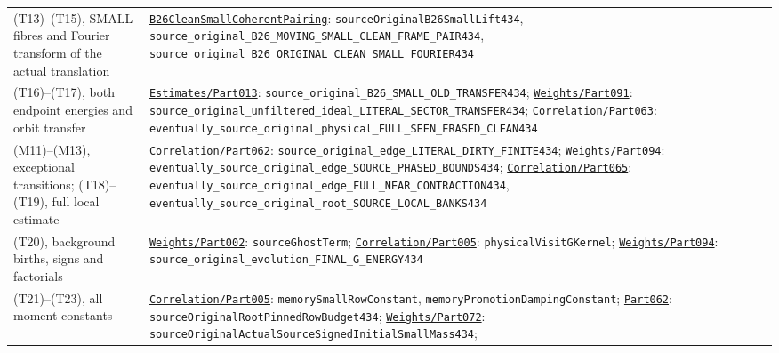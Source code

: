 \begin{longtable}[]{@{}
  >{\raggedright\arraybackslash}p{}
  >{\raggedright\arraybackslash}p{}@{}}
(T13)--(T15), SMALL fibres and Fourier transform of the actual
translation &
\href{../Green64/Library/Weights/B26CleanSmallCoherentPairing.lean}{\nolinkurl{B26CleanSmallCoherentPairing}}:
{\small\nolinkurl{sourceOriginalB26SmallLift434}},
{\small\nolinkurl{source_original_B26_MOVING_SMALL_CLEAN_FRAME_PAIR434}},
{\small\nolinkurl{source_original_B26_ORIGINAL_CLEAN_SMALL_FOURIER434}} \\
(T16)--(T17), both endpoint energies and orbit transfer &
\href{../Green64/Library/Analysis/Estimates/Part013.lean}{\nolinkurl{Estimates/Part013}}:
{\small\nolinkurl{source_original_B26_SMALL_OLD_TRANSFER434}};
\href{../Green64/Library/Weights/Part091.lean}{\nolinkurl{Weights/Part091}}:
{\small\nolinkurl{source_original_unfiltered_ideal_LITERAL_SECTOR_TRANSFER434}};
\href{../Green64/Library/Correlation/Part063.lean}{\nolinkurl{Correlation/Part063}}:
{\small\nolinkurl{eventually_source_original_physical_FULL_SEEN_ERASED_CLEAN434}} \\
(M11)--(M13), exceptional transitions; (T18)--(T19), full local estimate
&
\href{../Green64/Library/Correlation/Part062.lean}{\nolinkurl{Correlation/Part062}}:
{\small\nolinkurl{source_original_edge_LITERAL_DIRTY_FINITE434}};
\href{../Green64/Library/Weights/Part094.lean}{\nolinkurl{Weights/Part094}}:
{\small\nolinkurl{eventually_source_original_edge_SOURCE_PHASED_BOUNDS434}};
\href{../Green64/Library/Correlation/Part065.lean}{\nolinkurl{Correlation/Part065}}:
{\small\nolinkurl{eventually_source_original_edge_FULL_NEAR_CONTRACTION434}},
{\small\nolinkurl{eventually_source_original_root_SOURCE_LOCAL_BANKS434}} \\
(T20), background births, signs and factorials &
\href{../Green64/Library/Weights/Part002.lean}{\nolinkurl{Weights/Part002}}:
{\small\nolinkurl{sourceGhostTerm}};
\href{../Green64/Library/Correlation/Part005.lean}{\nolinkurl{Correlation/Part005}}:
{\small\nolinkurl{physicalVisitGKernel}};
\href{../Green64/Library/Weights/Part094.lean}{\nolinkurl{Weights/Part094}}:
{\small\nolinkurl{source_original_evolution_FINAL_G_ENERGY434}} \\
(T21)--(T23), all moment constants &
\href{../Green64/Library/Correlation/Part005.lean}{\nolinkurl{Correlation/Part005}}:
{\small\nolinkurl{memorySmallRowConstant}},
{\small\nolinkurl{memoryPromotionDampingConstant}};
\href{../Green64/Library/Correlation/Part062.lean}{\nolinkurl{Part062}}:
{\small\nolinkurl{sourceOriginalRootPinnedRowBudget434}};
\href{../Green64/Library/Weights/Part072.lean}{\nolinkurl{Weights/Part072}}:
{\small\nolinkurl{sourceOriginalActualSourceSignedInitialSmallMass434}};

\end{longtable}
